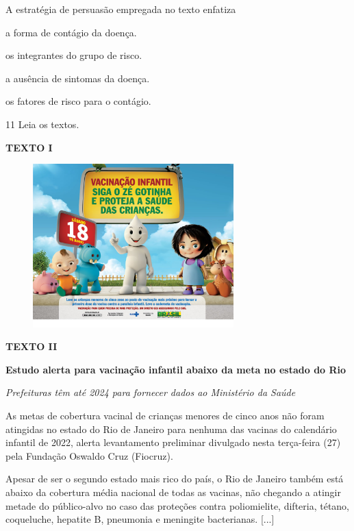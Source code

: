 A estratégia de persuasão empregada no texto enfatiza

\begin{escolha}
\item
  a forma de contágio da doença.
\item
  os integrantes do grupo de risco.
\item
  a ausência de sintomas da doença.
\item
  os fatores de risco para o contágio.
\end{escolha}

\num{11} Leia os textos.

\textbf{TEXTO I}

\begin{figure}[H]
\centering
\includegraphics[height=2.48418in]{./imgSAEB_8_POR/media/image32.png}
\end{figure}

\textbf{TEXTO II}

\begin{myquote}
\textbf{Estudo alerta para vacinação infantil abaixo da meta no estado
do Rio}

\emph{Prefeituras têm até 2024 para fornecer dados ao Ministério da Saúde}

As metas de cobertura vacinal de crianças menores de cinco anos não
foram atingidas no estado do Rio de Janeiro para nenhuma das vacinas do
calendário infantil de 2022, alerta levantamento preliminar divulgado
nesta terça-feira (27) pela Fundação Oswaldo Cruz (Fiocruz).

Apesar de ser o segundo estado mais rico do país, o Rio de Janeiro
também está abaixo da cobertura média nacional de todas as vacinas, não
chegando a atingir metade do público-alvo no caso das proteções contra
poliomielite, difteria, tétano, coqueluche, hepatite B, pneumonia e
meningite bacterianas. {[}...{]}

\end{myquote}

